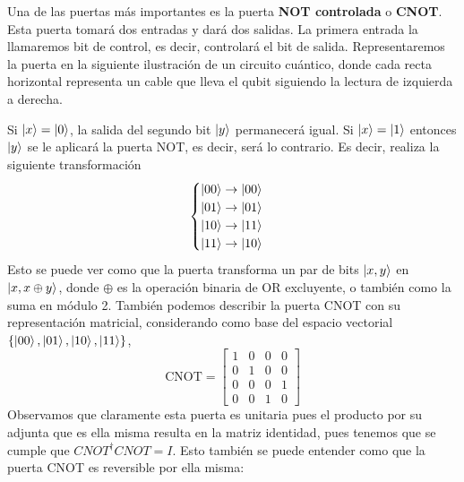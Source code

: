 \documentclass[a4paper]{article}
\numberwithin{equation}{section}
\begin{document}
Una de las puertas más importantes es la puerta \textbf{NOT controlada} o \textbf{CNOT}. Esta puerta tomará dos entradas y dará dos salidas. La primera entrada la llamaremos bit de control, es decir, controlará el bit de salida. Representaremos la puerta en la siguiente ilustración de un circuito cuántico, donde cada recta horizontal representa un cable que lleva el qubit siguiendo la lectura de izquierda a derecha.
\begin{figure}[h]
\centering
{}
\end{figure}
Si $\ket{x} = \ket{0}$, la salida del segundo bit $\ket{y}$ permanecerá igual. Si  $\ket{x} = \ket{1}$ entonces $\ket{y}$ se le aplicará la puerta NOT, es decir, será lo contrario. Es decir, realiza la siguiente transformación
\begin{equation}
\begin{cases}
\ket{00} \rightarrow \ket{00} \\
\ket{01} \rightarrow \ket{01} \\
\ket{10} \rightarrow \ket{11} \\
\ket{11} \rightarrow \ket{10}
\end{cases}
\end{equation}
Esto se puede ver como que la puerta transforma un par de bits $\ket{x, y}$ en $\ket{x, x\oplus y}$, donde $\oplus$ es la operación binaria de OR excluyente, o también como la suma en módulo 2.
También podemos describir la puerta CNOT con su representación matricial, considerando como base del espacio vectorial $\lbrace \ket{00}, \ket{01}, \ket{10}, \ket{11} \rbrace$,
\begin{equation}
\textrm{CNOT} = \begin{bmatrix}
1 & 0 & 0 & 0 \\
0 & 1 & 0 & 0 \\
0 & 0 & 0 & 1 \\
0 & 0 & 1 & 0 
\end{bmatrix}
\end{equation}
Observamos que claramente esta puerta es unitaria pues el producto por su adjunta que es ella misma resulta en la matriz identidad, pues tenemos que se cumple que $CNOT^{\dagger} CNOT = I$.
Esto también se puede entender como que la puerta CNOT es reversible por ella misma:\\
\end{document}
